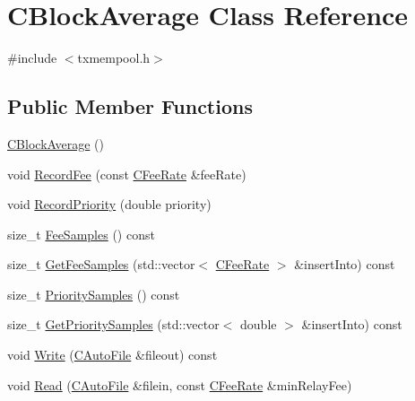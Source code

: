 \hypertarget{class_c_block_average}{}\section{C\+Block\+Average Class Reference}
\label{class_c_block_average}


{\ttfamily \#include $<$txmempool.\+h$>$}

\subsection*{Public Member Functions}
\begin{DoxyCompactItemize}
\item 
\hyperlink{class_c_block_average_adec219b95a2e1c67471f188dee48fb3a}{C\+Block\+Average} ()
\item 
void \hyperlink{class_c_block_average_a50af3241dc8fb3e49e1e980ed2a7fc95}{Record\+Fee} (const \hyperlink{class_c_fee_rate}{C\+Fee\+Rate} \&fee\+Rate)
\item 
void \hyperlink{class_c_block_average_ae4d71208ccf3ecd85751ce3644d12853}{Record\+Priority} (double priority)
\item 
size\+\_\+t \hyperlink{class_c_block_average_a9e63c1415286edf12ac82145723e564f}{Fee\+Samples} () const 
\item 
size\+\_\+t \hyperlink{class_c_block_average_a43152caddf026ec3f430d55435735ee4}{Get\+Fee\+Samples} (std\+::vector$<$ \hyperlink{class_c_fee_rate}{C\+Fee\+Rate} $>$ \&insert\+Into) const 
\item 
size\+\_\+t \hyperlink{class_c_block_average_a5b6ca2bd5fe9093ba81af14d7882145d}{Priority\+Samples} () const 
\item 
size\+\_\+t \hyperlink{class_c_block_average_a5f56bd04cccb15d891f7dfb41af8b382}{Get\+Priority\+Samples} (std\+::vector$<$ double $>$ \&insert\+Into) const 
\item 
void \hyperlink{class_c_block_average_a2c549117b02d3366cbc840dbdf5ebd6b}{Write} (\hyperlink{class_c_auto_file}{C\+Auto\+File} \&fileout) const 
\item 
void \hyperlink{class_c_block_average_aac4081eec4bf68d7d3a07521ea953489}{Read} (\hyperlink{class_c_auto_file}{C\+Auto\+File} \&filein, const \hyperlink{class_c_fee_rate}{C\+Fee\+Rate} \&min\+Relay\+Fee)
\end{DoxyCompactItemize}
